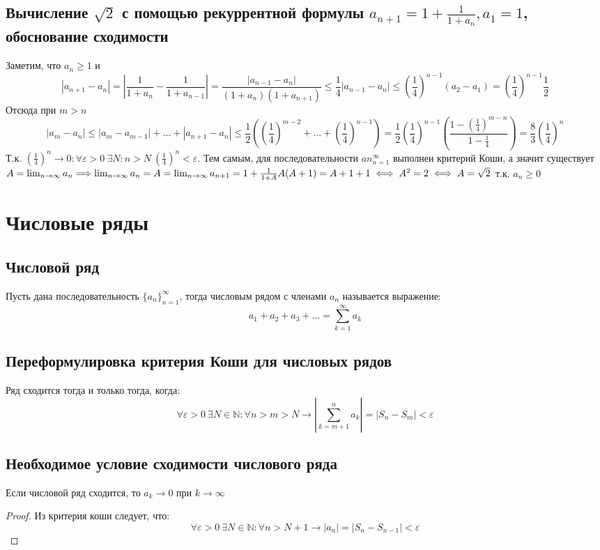 \documentclass[12pt]{article}
\theoremstyle{definition}
\begin{document}
\subsection{Вычисление $\sqrt{2}$ с помощью рекуррентной формулы $a_{n+1} = 1 + \frac{1}{1+a_n}, a_1 = 1$, обоснование сходимости} Заметим, что $a_n \geqslant 1$ и $$|a_{n+1} - a_n| = \left|\frac{1}{1+a_n} - \frac{1}{1+a_{n-1}} \right| = \frac{|a_{n-1} - a_n|}{(1+a_n)(1+a_{n+1})} \leqslant \frac{1}{4}|a_{n-1} - a_n| \leqslant \left(\frac{1}{4}\right)^{n-1}(a_2 - a_1) = \left(\frac{1}{4}\right)^{n-1} \frac{1}{2}$$ Отсюда при $m > n$ $$|a_m - a_n| \leqslant |a_m - a_{m-1}| +...+ |a_{n+1} - a_n| \leqslant \frac{1}{2}\left(\left(\frac{1}{4}\right)^{m-2} + ... + \left(\frac{1}{4}\right)^{n-1}\right) = \frac{1}{2}\left(\frac{1}{4}\right)^{n-1}\left(\frac{1 - \left(\frac{1}{4}\right)^{m-n}}{1 - \frac{1}{4}}\right) = \frac{8}{3}\left(\frac{1}{4}\right)^n$$ Т.к. $\left(\frac{1}{4}\right)^n \rightarrow 0: \forall \varepsilon > 0 \ \exists N: n> N \ \left(\frac{1}{4}\right)^n < \varepsilon$. Тем самым, для последовательности ${an}_{n=1}^\infty$ выполнен критерий Коши, а значит существует $A = \lim_{n\to\infty} a_n \Longrightarrow \lim_{n\to\infty} a_n = A = \lim_{n\to\infty} a_{n+1} = 1 + \frac{1}{1 + A} \\ A(A+1) = A + 1 + 1 \iff A^2 = 2 \iff A = \sqrt{2}$ т.к. $a_n \geqslant 0$

\section{Числовые ряды}

\subsection{Числовой ряд}
Пусть дана последовательность $\textstyle\{a_n\}_{n=1}^{\infty}$, тогда числовым рядом с членами $a_n$ называется выражение:
$$a_1 + a_2 + a_3 + ... = \displaystyle\sum_{k = 1}^{\infty}a_k$$

\subsection{Переформулировка критерия Коши для числовых рядов}
Ряд сходится тогда и только тогда, когда:
$$\forall \varepsilon > 0 \ \exists N \in \mathbb{N} : \forall n > m > N \to \left|\displaystyle\sum_{k = m + 1}^n a_k\right| = |S_n - S_m| < \varepsilon$$

\subsection{Необходимое условие сходимости числового ряда}
Если числовой ряд сходится, то $a_k \to 0$ при $k \to \infty $
\begin{proof}
Из критерия коши следует, что: $$\forall \varepsilon > 0 \ \exists N \in \mathbb{N}: \forall n >  N + 1 \to |a_n| = |S_n - S_{n-1}| < \varepsilon$$
\end{proof}
\end{document}
